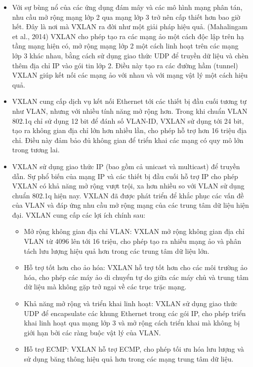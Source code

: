 \documentclass[13pt]{article}
\begin{document}
\begin{itemize}
    \item Với sự bùng nổ của các ứng dụng đám mây và các mô hình mạng phân tán, nhu cầu mở rộng mạng lớp 2 qua mạng lớp 3 trở nên cấp thiết hơn bao giờ hết. Đây là nơi mà VXLAN ra đời như một giải pháp hiệu quả. (Mahalingam et al., 2014) VXLAN cho phép tạo ra các mạng ảo một cách độc lập trên hạ tầng mạng hiện có, mở rộng mạng lớp 2 một cách linh hoạt trên các mạng lớp 3 khác nhau, bằng cách sử dụng giao thức UDP để truyền dữ liệu và chèn thêm địa chỉ IP vào gói tin lớp 2. Điều này tạo ra các đường hầm (tunnel) VXLAN giúp kết nối các mạng ảo với nhau và với mạng vật lý một cách hiệu quả.
    \item VXLAN cung cấp dịch vụ kết nối Ethernet tới các thiết bị đầu cuối tương tự như VLAN, nhưng với nhiều tính năng mở rộng hơn. Trong khi chuẩn VLAN 802.1q chỉ sử dụng 12 bit để đánh số VLAN-ID, VXLAN sử dụng tới 24 bit, tạo ra không gian địa chỉ lớn hơn nhiều lần, cho phép hỗ trợ hơn 16 triệu địa chỉ. Điều này đảm bảo đủ không gian để triển khai các mạng có quy mô lớn trong tương lai.
    \item VXLAN sử dụng giao thức IP (bao gồm cả unicast và multicast) để truyền dẫn. Sự phổ biến của mạng IP và các thiết bị đầu cuối hỗ trợ IP cho phép VXLAN có khả năng mở rộng vượt trội, xa hơn nhiều so với VLAN sử dụng chuẩn 802.1q hiện nay. VXLAN đã được phát triển để khắc phục các vấn đề của VLAN và đáp ứng nhu cầu mở rộng mạng của các trung tâm dữ liệu hiện đại. VXLAN cung cấp các lợi ích chính sau:
    \begin{itemize}
        \item Mở rộng không gian địa chỉ VLAN: VXLAN mở rộng không gian địa chỉ VLAN từ 4096 lên tới 16 triệu, cho phép tạo ra nhiều mạng ảo và phân tách lưu lượng hiệu quả hơn trong các trung tâm dữ liệu lớn.
        \item Hỗ trợ tốt hơn cho ảo hóa: VXLAN hỗ trợ tốt hơn cho các môi trường ảo hóa, cho phép các máy ảo di chuyển tự do giữa các máy chủ và trung tâm dữ liệu mà không gặp trở ngại về các trục trặc mạng.
        \item Khả năng mở rộng và triển khai linh hoạt: VXLAN sử dụng giao thức UDP để encapsulate các khung Ethernet trong các gói IP, cho phép triển khai linh hoạt qua mạng lớp 3 và mở rộng cách triển khai mà không bị giới hạn bởi các ràng buộc vật lý của VLAN.
        \item Hỗ trợ ECMP: VXLAN hỗ trợ ECMP, cho phép tối ưu hóa lưu lượng và sử dụng băng thông hiệu quả
hơn trong các mạng trung tâm dữ liệu.
    \end{itemize}
\end{itemize}
\end{document}
